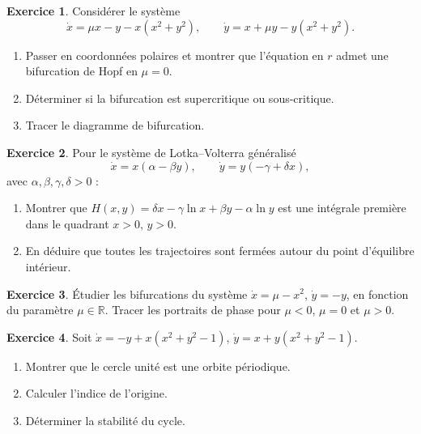 \documentclass[12pt,a4paper,openany]{book}
\theoremstyle{definition}
\newtheorem{exercice}{Exercice}[chapter]
\theoremstyle{plain}
\theoremstyle{remark}
\newcommand{\R}{\mathbb{R}}
\begin{document}
\begin{exercice}
\label{exo:hopf-exo}
Considérer le système
\[
\dot{x} = \mu x - y - x(x^2 + y^2), \qquad
\dot{y} = x + \mu y - y(x^2 + y^2).
\]
\begin{enumerate}[label=\alph*)]
  \item Passer en coordonnées polaires et montrer que l'équation
        en $r$ admet une bifurcation de Hopf en $\mu = 0$.
  \item Déterminer si la bifurcation est supercritique ou
        sous-critique.
  \item Tracer le diagramme de bifurcation.
\end{enumerate}
\end{exercice}

\begin{exercice}
\label{exo:LV-generique}
Pour le système de Lotka--Volterra généralisé
\[
\dot{x} = x(\alpha - \beta y), \qquad \dot{y} = y(-\gamma + \delta x),
\]
avec $\alpha, \beta, \gamma, \delta > 0$ :
\begin{enumerate}[label=\alph*)]
  \item Montrer que $H(x,y) = \delta x - \gamma \ln x
        + \beta y - \alpha \ln y$ est une intégrale première dans le
        quadrant $x > 0$, $y > 0$.
  \item En déduire que toutes les trajectoires sont fermées autour
        du point d'équilibre intérieur.
\end{enumerate}
\end{exercice}

\begin{exercice}
\label{exo:bif-noeud-col-exo}
Étudier les bifurcations du système
$\dot{x} = \mu - x^2$, $\dot{y} = -y$,
en fonction du paramètre $\mu \in \R$. Tracer les portraits de phase
pour $\mu < 0$, $\mu = 0$ et $\mu > 0$.
\end{exercice}

\begin{exercice}
\label{exo:indice-exo}
Soit $\dot{x} = -y + x(x^2 + y^2 - 1)$,
$\dot{y} = x + y(x^2 + y^2 - 1)$.
\begin{enumerate}[label=\alph*)]
  \item Montrer que le cercle unité est une orbite périodique.
  \item Calculer l'indice de l'origine.
  \item Déterminer la stabilité du cycle.
\end{enumerate}
\end{exercice}
\end{document}

